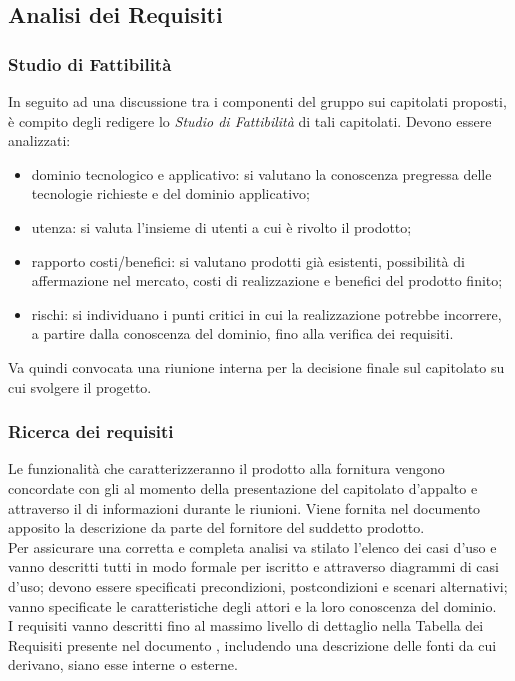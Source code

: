 \subsection{Analisi dei Requisiti}
\subsubsection{Studio di Fattibilità}
In seguito ad una discussione tra i componenti del gruppo sui capitolati proposti, è compito degli \Analisti{} redigere lo \textit{Studio di Fattibilità} di tali capitolati. Devono essere analizzati:
\begin{itemize}
	\item dominio tecnologico e applicativo: si valutano la conoscenza pregressa delle tecnologie richieste e del dominio applicativo;
	\item utenza: si valuta l'insieme di utenti a cui è rivolto il prodotto;
	\item rapporto costi/benefici: si valutano prodotti già esistenti, possibilità di affermazione nel mercato, costi di realizzazione e benefici del prodotto finito;
	\item rischi: si individuano i punti critici in cui la realizzazione potrebbe incorrere, a partire dalla conoscenza del dominio, fino alla verifica dei requisiti.
\end{itemize}
Va quindi convocata una riunione interna per la decisione finale sul capitolato su cui svolgere il progetto.

\subsubsection{Ricerca dei requisiti}
Le funzionalità che caratterizzeranno il prodotto alla fornitura vengono concordate con gli  al momento della presentazione del capitolato d'appalto e attraverso il  di informazioni durante le riunioni. Viene fornita nel documento apposito \AnalisiDeiRequisiti{} la descrizione da parte del fornitore del suddetto prodotto.\\
Per assicurare una corretta e completa analisi va stilato l'elenco dei casi d'uso e vanno descritti tutti in modo formale per iscritto e attraverso diagrammi di casi d'uso; devono essere specificati precondizioni, postcondizioni e scenari alternativi; vanno specificate le caratteristiche degli attori e la loro conoscenza del dominio.\\
I requisiti vanno descritti fino al massimo livello di dettaglio nella Tabella dei Requisiti presente nel documento \AnalisiDeiRequisiti, includendo una descrizione delle fonti da cui derivano, siano esse interne o esterne.

